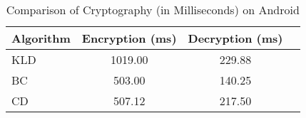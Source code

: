 \begin{table}[t]
\caption{Comparison of Cryptography (in Milliseconds) on Android}
\centering
\begin{tabular}{|l|c|c|c|}
\hline
\textbf{Algorithm} & \textbf{Encryption (ms)} & \textbf{Decryption (ms)} \\
\hline
KLD & 1019.00 & 229.88 \\
BC  & 503.00 & 140.25 \\
CD  & 507.12 & 217.50 \\
\hline
\end{tabular}
\label{table:cryptography}
\end{table}
